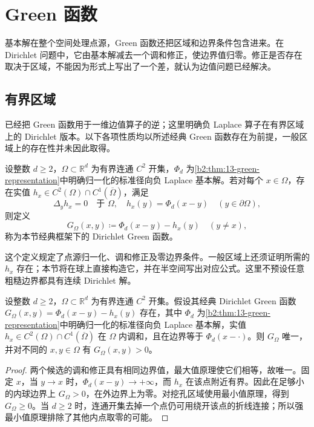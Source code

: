 \section{Green 函数}
\label{b2:sec:1304}

基本解在整个空间处理点源，Green 函数还把区域和边界条件包含进来。在 Dirichlet 问题中，它由基本解减去一个调和修正，使边界值归零。修正是否存在取决于区域，不能因为形式上写出了一个差，就认为边值问题已经解决。

\subsection{有界区域}
\label{b2:subsec:130401}

已经把 Green 函数用于一维边值算子的逆；这里明确负 Laplace 算子在有界区域上的 Dirichlet 版本。以下各项性质均以所述经典 Green 函数存在为前提，一般区域上的存在性并未因此取得。

\begin{definition}\label{b2:def:13-dirichlet-green}
设整数 \(d\geq2\)，\(\Omega\subset\mathbb R^d\) 为有界连通 \(C^2\) 开集，\(\Phi_d\) 为\cref{b2:thm:13-green-representation}中明确归一化的标准径向负 Laplace 基本解。若对每个 \(x\in\Omega\)，存在实值 \(h_x\in C^2(\Omega)\cap C^1(\overline\Omega)\)，满足
\[
 \Delta_yh_x=0\quad\text{于 }\Omega,
 \quad h_x(y)=\Phi_d(x-y)\quad(y\in\partial\Omega),
\]
则定义
\[
 G_\Omega(x,y)\coloneqq\Phi_d(x-y)-h_x(y)\quad(y\ne x),
\]
称为本节经典框架下的 Dirichlet Green 函数。
\end{definition}

这个定义规定了点源归一化、调和修正及零边界条件。一般区域上还须证明所需的 \(h_x\) 存在；本节将在球上直接构造它，并在半空间写出对应公式。这里不预设任意粗糙边界都具有连续 Dirichlet 解。

\begin{proposition}\label{b2:prop:13-green-positive}
设整数 \(d\geq2\)，\(\Omega\subset\mathbb R^d\) 为有界连通 \(C^2\) 开集。假设其经典 Dirichlet Green 函数 \(G_\Omega(x,y)=\Phi_d(x-y)-h_x(y)\) 存在，其中 \(\Phi_d\) 为\cref{b2:thm:13-green-representation}中明确归一化的标准径向负 Laplace 基本解，实值 \(h_x\in C^2(\Omega)\cap C^1(\overline\Omega)\) 在 \(\Omega\) 内调和，且在边界等于 \(\Phi_d(x-\cdot)\)。则 \(G_\Omega\) 唯一，并对不同的 \(x,y\in\Omega\) 有 \(G_\Omega(x,y)>0\)。
\end{proposition}
\begin{proof}
两个候选的调和修正具有相同边界值，最大值原理使它们相等，故唯一。固定 \(x\)，当 \(y\to x\) 时，\(\Phi_d(x-y)\to+\infty\)，而 \(h_x\) 在该点附近有界。因此在足够小的内球边界上 \(G_\Omega>0\)，在外边界上为零。对挖孔区域使用最小值原理，得到 \(G_\Omega\geq0\)。当 \(d\geq2\) 时，连通开集去掉一个点仍可用绕开该点的折线连接；所以强最小值原理排除了其他内点取零的可能。
\end{proof}

